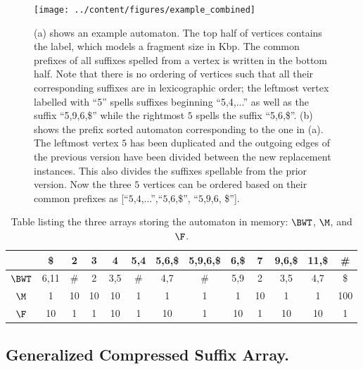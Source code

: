 \documentclass[doctor]{thesis}
\begin{document}
 
\makeatletter{}
\begin{figure}[h!]
 \centering
 \texttt{[image: ../content/figures/example\_combined]}
  \caption{(a) shows an example automaton.  The top half of vertices contains the label, which models a fragment size in Kbp.  The common prefixes of all suffixes spelled from a vertex is written in the bottom half.  Note that there is no ordering of vertices such that all their corresponding suffixes are in lexicographic order;  the leftmost vertex labelled with ``5'' spells suffixes beginning ``5,4,...'' as well as the suffix ``5,9,6,\$'' while the rightmost $5$  spells the suffix ``5,6,\$''. (b) shows the prefix sorted automaton corresponding to the one in (a).  The leftmost vertex $5$ has been duplicated and the outgoing edges of the previous version have been divided between the new replacement instances.  This also divides the suffixes spellable from the prior version.  Now the three $5$ vertices can be ordered based on their common prefixes as [``$5$,$4$,...'',``$5$,$6$,\$'', ``$5$,$9$,$6$, \$'']. }
\label{fig:example}
\end{figure}

\begin{table}[h!]
\begin{center}
  \begin{tabular}{ccccccccccccc}
  	\hline
		& \$		& 2		& 3		& 4		& 5,4		& 5,6,\$	& 5,9,6,\$	& 6,\$	& 7	& 9,6,\$	& 11,\$	& \# \\
	\hline
$\BWT$	& 6,11	& \#		& 2		& 3,5		& \#		& 4,7		& \#		& 5,9		& 2	& 3,5		& 4,7		& \$ \\
$\M$		& 1		& 10		& 10		& 10		& 1		& 1		& 1		& 1		&10	& 1		& 1 		& 100 \\
$\F$		& 10		& 1		& 1		& 10		& 1		& 10		& 1		& 10		& 1	& 10		& 10		& 1 \\		
	\hline
	\end{tabular}
      \caption{Table listing the three arrays storing the automaton in memory: $\BWT$, $\M$, and $\F$.}
 \label{bwt-table}
\end{center}
\end{table}


\subsection{Generalized Compressed Suffix Array.}
\end{document}
